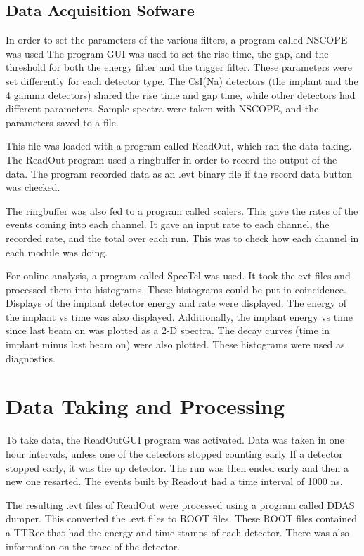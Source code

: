 \subsection{Data Acquisition Sofware}
In order to set the parameters of the various filters, a program called NSCOPE was used \cite{REFHERE}
The program GUI was used to set the rise time, the gap, and the threshold for both the energy filter and the trigger filter.
These parameters were set differently for each detector type.
The CsI(Na) detectors (the implant and the 4 gamma detectors) shared the rise time and gap time, while other detectors had different parameters.
Sample spectra were taken with NSCOPE, and the parameters saved to a file.

This file was loaded with a program called ReadOut, which ran the data taking.
The ReadOut program used a ringbuffer in order to record the output of the data.
The program recorded data as an .evt binary file if the record data button was checked.

The ringbuffer was also fed to a program called scalers.
This gave the rates of the events coming into each channel.
It gave an input rate to each channel, the recorded rate, and the total over each run.
This was to check how each channel in each module was doing.

For online analysis, a program called SpecTcl was used.
It took the evt files and processed them into histograms.
These histograms could be put in coincidence.
Displays of the implant detector energy and rate were displayed.
The energy of the implant vs time was also displayed.
Additionally, the implant energy vs time since last beam on was plotted as a 2-D spectra.
The decay curves (time in implant minus last beam on) were also plotted.
These histograms were used as diagnostics. 

\section{Data Taking and Processing}
To take data, the ReadOutGUI program was activated. 
Data was taken in one hour intervals, unless one of the detectors stopped counting early
If a detector stopped early, it was the up detector.
The run was then ended early and then a new one resarted.
The events built by Readout had a time interval of 1000 ns.

The resulting .evt files of ReadOut were processed using a program called DDAS dumper.
This converted the .evt files to ROOT files.
These ROOT files contained a TTRee that had the energy and time stamps of each detector.
There was also information on the trace of the detector.

